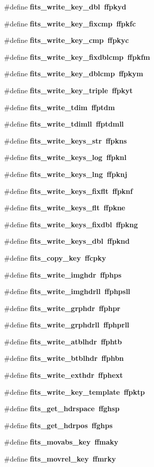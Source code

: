 \begin{CompactItemize}
\#define \bf{fits\_\-write\_\-key\_\-dbl}~ffpkyd
\item 
\#define \bf{fits\_\-write\_\-key\_\-fixcmp}~ffpkfc
\item 
\#define \bf{fits\_\-write\_\-key\_\-cmp}~ffpkyc
\item 
\#define \bf{fits\_\-write\_\-key\_\-fixdblcmp}~ffpkfm
\item 
\#define \bf{fits\_\-write\_\-key\_\-dblcmp}~ffpkym
\item 
\#define \bf{fits\_\-write\_\-key\_\-triple}~ffpkyt
\item 
\#define \bf{fits\_\-write\_\-tdim}~ffptdm
\item 
\#define \bf{fits\_\-write\_\-tdimll}~ffptdmll
\item 
\#define \bf{fits\_\-write\_\-keys\_\-str}~ffpkns
\item 
\#define \bf{fits\_\-write\_\-keys\_\-log}~ffpknl
\item 
\#define \bf{fits\_\-write\_\-keys\_\-lng}~ffpknj
\item 
\#define \bf{fits\_\-write\_\-keys\_\-fixflt}~ffpknf
\item 
\#define \bf{fits\_\-write\_\-keys\_\-flt}~ffpkne
\item 
\#define \bf{fits\_\-write\_\-keys\_\-fixdbl}~ffpkng
\item 
\#define \bf{fits\_\-write\_\-keys\_\-dbl}~ffpknd
\item 
\#define \bf{fits\_\-copy\_\-key}~ffcpky
\item 
\#define \bf{fits\_\-write\_\-imghdr}~ffphps
\item 
\#define \bf{fits\_\-write\_\-imghdrll}~ffphpsll
\item 
\#define \bf{fits\_\-write\_\-grphdr}~ffphpr
\item 
\#define \bf{fits\_\-write\_\-grphdrll}~ffphprll
\item 
\#define \bf{fits\_\-write\_\-atblhdr}~ffphtb
\item 
\#define \bf{fits\_\-write\_\-btblhdr}~ffphbn
\item 
\#define \bf{fits\_\-write\_\-exthdr}~ffphext
\item 
\#define \bf{fits\_\-write\_\-key\_\-template}~ffpktp
\item 
\#define \bf{fits\_\-get\_\-hdrspace}~ffghsp
\item 
\#define \bf{fits\_\-get\_\-hdrpos}~ffghps
\item 
\#define \bf{fits\_\-movabs\_\-key}~ffmaky
\item 
\#define \bf{fits\_\-movrel\_\-key}~ffmrky

\end{CompactItemize}
